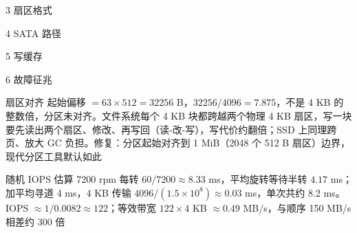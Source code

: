\begin{chapteranswer}{3}
扇区格式
\end{chapteranswer}

\begin{chapteranswer}{4}
SATA 路径
\end{chapteranswer}

\begin{chapteranswer}{5}
写缓存
\end{chapteranswer}

\begin{chapteranswer}{6}
故障征兆
\end{chapteranswer}

\begin{chapteranswer}{扇区对齐}
起始偏移 $=63\times512=32256$ B，$32256/4096=7.875$，不是 4 KB 的整数倍，分区未对齐。文件系统每个 4 KB 块都跨越两个物理 4 KB 扇区，写一块要先读出两个扇区、修改、再写回（读-改-写），写代价约翻倍；SSD 上同理跨页、放大 GC 负担。修复：分区起始对齐到 1 MiB（2048 个 512 B 扇区）边界，现代分区工具默认如此
\end{chapteranswer}

\begin{chapteranswer}{随机 IOPS 估算}
7200 rpm 每转 $60/7200\approx8.33$ ms，平均旋转等待半转 $4.17$ ms；加平均寻道 4 ms，4 KB 传输 $4096/(1.5\times10^{8})\approx0.03$ ms，单次共约 8.2 ms。IOPS $\approx1/0.0082\approx122$；等效带宽 $122\times4$ KB $\approx0.49$ MB/s，与顺序 150 MB/s 相差约 300 倍
\end{chapteranswer}
